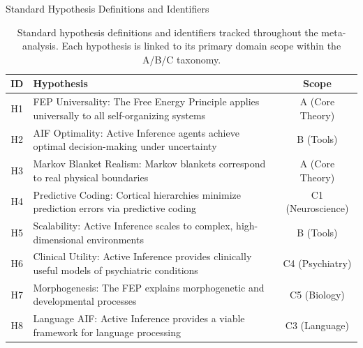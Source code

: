 \documentclass[
  ignorenonframetext,
]{beamer}
\begin{document}
\begin{frame}{Standard Hypothesis Definitions and Identifiers}
\protect{}\label{standard-hypothesis-definitions-and-identifiers}
\begin{table}[htbp]
\centering
\caption{Standard hypothesis definitions and identifiers tracked throughout the meta-analysis. Each hypothesis is linked to its primary domain scope within the A/B/C taxonomy.}
\label{tab:hypothesis_definitions}
\begin{tabular}{clc}
\toprule
\textbf{ID} & \textbf{Hypothesis} & \textbf{Scope} \\
\midrule
H1 & FEP Universality: The Free Energy Principle applies universally to all self-organizing systems & A (Core Theory) \\
H2 & AIF Optimality: Active Inference agents achieve optimal decision-making under uncertainty & B (Tools) \\
H3 & Markov Blanket Realism: Markov blankets correspond to real physical boundaries & A (Core Theory) \\
H4 & Predictive Coding: Cortical hierarchies minimize prediction errors via predictive coding & C1 (Neuroscience) \\
H5 & Scalability: Active Inference scales to complex, high-dimensional environments & B (Tools) \\
H6 & Clinical Utility: Active Inference provides clinically useful models of psychiatric conditions & C4 (Psychiatry) \\
H7 & Morphogenesis: The FEP explains morphogenetic and developmental processes & C5 (Biology) \\
H8 & Language AIF: Active Inference provides a viable framework for language processing & C3 (Language) \\
\bottomrule
\end{tabular}
\end{table}
\end{frame}
\end{document}
